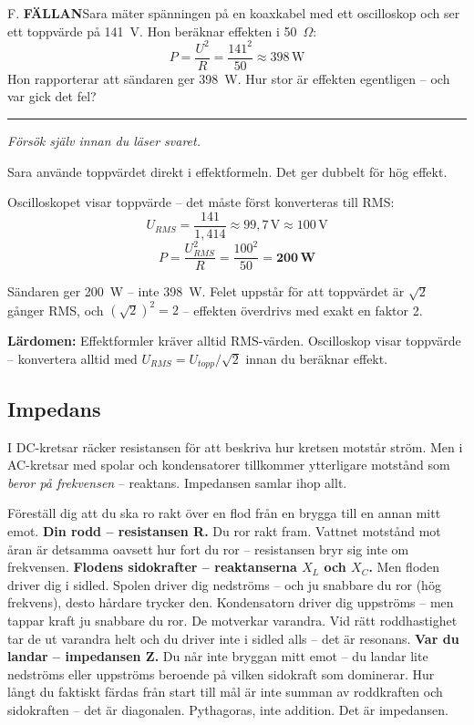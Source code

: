 \documentclass[a4paper,11pt,twoside]{book}
\newcommand{\emoji}[1]{{\emojifont #1}}
\newcommand{\qfallan}{\colorbox{ljusbrun}{\textcolor{kakao}{\headingfont\bfseries\tiny FÄLLAN}}}
\begin{document}
\begin{qblock}{F.}
\qfallan\quad Sara mäter spänningen på en koaxkabel
med ett oscilloskop och ser ett toppvärde på 141~V.
Hon beräknar effekten i 50~$\Omega$:
\[ P = \frac{U^2}{R} = \frac{141^2}{50} \approx 398\,\text{W} \]
Hon rapporterar att sändaren ger 398~W.
Hur stor är effekten egentligen -- och var gick det fel?
\end{qblock}

\medskip
\noindent\rule{\textwidth}{0.4pt}
{\small\itshape Försök själv innan du läser svaret.}
\medskip

\begin{worked}[title={Lösning -- Fallgropsfråga 1.7.2\,F}]
Sara använde toppvärdet direkt i effektformeln.
Det ger dubbelt för hög effekt.

Oscilloskopet visar toppvärde -- det måste först
konverteras till RMS:
\[ U_{RMS} = \frac{141}{1{,}414} \approx 99{,}7\,\text{V} \approx 100\,\text{V} \]
\[ P = \frac{U_{RMS}^2}{R} = \frac{100^2}{50} = \mathbf{200\,\text{W}} \]

Sändaren ger 200~W -- inte 398~W. Felet uppstår
för att toppvärdet är $\sqrt{2}$ gånger RMS, och
$(\sqrt{2})^2 = 2$ -- effekten överdrivs med
exakt en faktor 2.

\textbf{Lärdomen:} Effektformler kräver alltid
RMS-värden. Oscilloskop visar toppvärde -- konvertera
alltid med $U_{RMS} = U_{topp} / \sqrt{2}$ innan
du beräknar effekt.
\end{worked}


\subsection{Impedans}

I DC-kretsar räcker resistansen för att beskriva hur
kretsen motstår ström. Men i AC-kretsar med spolar
och kondensatorer tillkommer ytterligare motstånd
som \emph{beror på frekvensen} -- reaktans. Impedansen
samlar ihop allt.

\begin{storybox}[{\emoji{🚣} Roddbåten och de tre krafterna}]
Föreställ dig att du ska ro rakt över en flod från
en brygga till en annan mitt emot.
\textbf{Din rodd -- resistansen R.}
Du ror rakt fram. Vattnet motstånd mot åran är
detsamma oavsett hur fort du ror -- resistansen
bryr sig inte om frekvensen.
\textbf{Flodens sidokrafter -- reaktanserna $X_L$ och $X_C$.}
Men floden driver dig i sidled. Spolen driver dig
nedströms -- och ju snabbare du ror (hög frekvens),
desto hårdare trycker den. Kondensatorn driver dig
uppströms -- men tappar kraft ju snabbare du ror.
De motverkar varandra. Vid rätt roddhastighet tar
de ut varandra helt och du driver inte i sidled alls
-- det är resonans.
\textbf{Var du landar -- impedansen Z.}
Du når inte bryggan mitt emot -- du landar lite
nedströms eller uppströms beroende på vilken
sidokraft som dominerar. Hur långt du faktiskt
färdas från start till mål är inte summan av
roddkraften och sidokraften -- det är diagonalen.
Pythagoras, inte addition. Det är impedansen.
\end{storybox}
\end{document}
